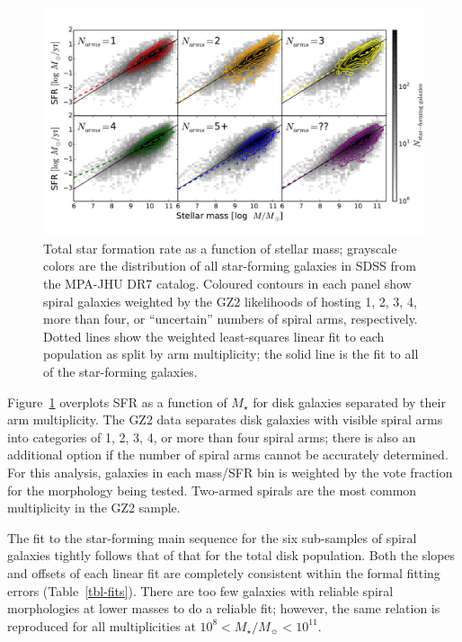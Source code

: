 \documentclass{emulateapj}
\begin{document}
\begin{figure}
\includegraphics[angle=0,width=7.0in]{figures/ms_arms_number_weighted_contour.pdf}
\caption{Total star formation rate as a function of stellar mass; grayscale colors are the distribution of all star-forming galaxies in SDSS from the MPA-JHU DR7 catalog. Coloured contours in each panel show spiral galaxies weighted by the GZ2 likelihoods of hosting 1, 2, 3, 4, more than four, or ``uncertain'' numbers of spiral arms, respectively. Dotted lines show the weighted least-squares linear fit to each population as split by arm multiplicity; the solid line is the fit to all of the star-forming galaxies. 
\label{fig-number}}
\end{figure}

Figure~\ref{fig-number} overplots SFR as a function of $M_\star$ for disk galaxies separated by their arm multiplicity. The GZ2 data separates disk galaxies with visible spiral arms into categories of 1, 2, 3, 4, or more than four spiral arms; there is also an additional option if the number of spiral arms cannot be accurately determined. For this analysis, galaxies in each mass/SFR bin is weighted by the vote fraction for the morphology being tested. Two-armed spirals are the most common multiplicity in the GZ2 sample.

The fit to the star-forming main sequence for the six sub-samples of spiral galaxies tightly follows that of that for the total disk population. Both the slopes and offsets of each linear fit are completely consistent within the formal fitting errors (Table~\ref{tbl-fits}). There are too few galaxies with reliable spiral morphologies at lower masses to do a reliable fit; however, the same relation is reproduced for all multiplicities at $10^8<M_\star/M_\sun<10^{11}$. 
\end{document}
